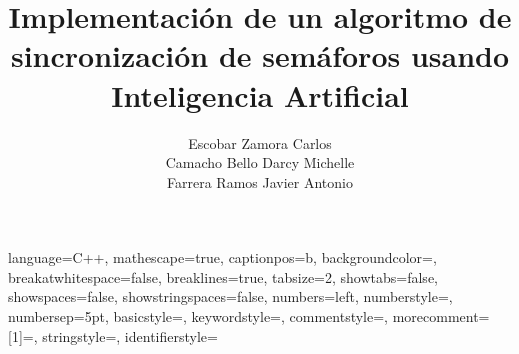 \documentclass[letterpaper,12pt,openany,oneside]{book}
\begin{document}


{
	language=C++,
	mathescape=true,
	captionpos=b,
	backgroundcolor=\color{background},
	breakatwhitespace=false,
	breaklines=true,
	tabsize=2,
	showtabs=false,
	showspaces=false,
	showstringspaces=false,
	numbers=left, numberstyle=\tiny\color{numbercolor}, numbersep=5pt,
	basicstyle=\footnotesize\ttfamily,
	keywordstyle=\color[HTML]{0071A8}, %
	commentstyle=\color[HTML]{777777},
	morecomment=[1]=\color{Crimson},
	stringstyle=\color[HTML]{534bae},
	identifierstyle=\color[HTML]{C30000} %
}	



	\author{Escobar Zamora Carlos\\Camacho Bello Darcy Michelle\\Farrera Ramos Javier Antonio}
	\title{Implementación de un algoritmo de sincronización de semáforos usando Inteligencia Artificial}
	
	\maketitle
	
	{\setlength{\baselineskip}{1\baselineskip}
		\tableofcontents
		\lstlistoflistings
	}

	\setlength{\parskip}{1ex plus 0.5ex minus 0.2ex}
	\setlength{\baselineskip}{1.5\baselineskip}
\end{document}

